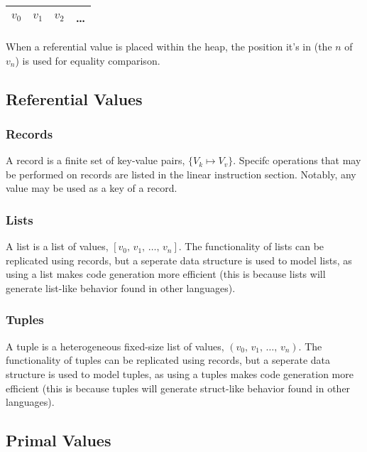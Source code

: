 \documentclass[twocolumn]{article}
\begin{document}
\begin{center}
  \begin{tabular}{ |c|c|c|c| }
    \hline
    $v_0$ & $v_1$ & $v_2$ & \dots \\
    \hline
  \end{tabular}
\end{center}

When a referential value is placed within the heap, the position it's in (the $n$ of $v_n$)
is used for equality comparison.

\subsection{Referential Values}

\subsubsection{Records}

A record is a finite set of key-value pairs, \(\{ V_k \mapsto V_v \}\). Specifc
operations that may be performed on records are listed in the linear instruction
section. Notably, any value may be used as a key of a record.

\subsubsection{Lists}

A list is a list of values, \([ v_0,\, v_1,\, \dots,\, v_n ]\). The functionality
of lists can be replicated using records, but a seperate data structure is used
to model lists, as using a list makes code generation more efficient (this is
because lists will generate list-like behavior found in other languages).

\subsubsection{Tuples}

A tuple is a heterogeneous fixed-size list of values, \((v_0,\, v_1,\, \dots,\, v_n)\).
The functionality of tuples can be replicated using records, but a seperate data
structure is used to model tuples, as using a tuples makes code generation more
efficient (this is because tuples will generate struct-like behavior found in other
languages).

\subsection{Primal Values}
\end{document}
